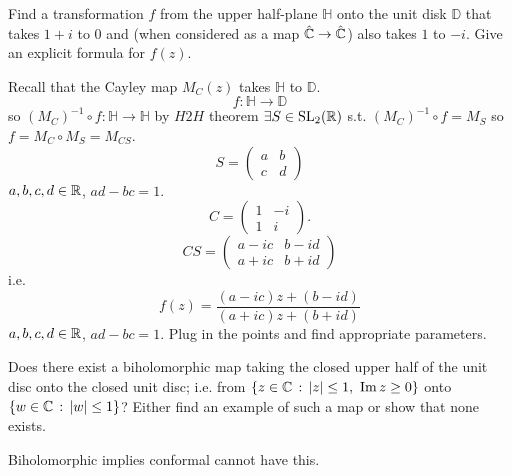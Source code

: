 \documentclass[10pt, a4paper]{article}
\begin{document}
\begin{problem}
    Find a \mobius transformation $f$ from the upper half-plane $\mathbb{H}$ onto the unit disk $\mathbb{D}$ that takes $1 + i$ to $0$ and
    (when considered as a map $\hat{\mathbb{C}} \to \hat{\mathbb{C}}$)
    also takes $1$ to $-i$.
    Give an explicit formula for $f(z)$.

    \begin{solution}
        Recall that the Cayley map $M_C(z)$ takes $\mathbb{H}$ to $\mathbb{D}$.
        \[
        f : \mathbb{H} \to \mathbb{D}
        \]
        so $(M_C) ^ {-1} \circ f : \mathbb{H} \to \mathbb{H}$ by $H2H$ theorem $\exists S \in \mathrm{SL}_2(\mathbb{R})$ s.t. $(M_C) ^ {-1} \circ f = M_S$ so $f = M_C \circ M_S = M_{CS}$.
        \[
        S = \begin{pmatrix}
            a & b \\ c & d
        \end{pmatrix}
        \]
        $a, b, c, d \in \mathbb{R}$,
        $ad - bc = 1$.
        \[
        C = \begin{pmatrix}
            1 & -i \\ 1 & i
        \end{pmatrix}.
        \]
        \[
        CS = \begin{pmatrix}
            a - ic & b - id \\
            a + ic & b + id
        \end{pmatrix}
        \]
        i.e.
        \[
        f(z) = \frac{(a - ic)z + (b - id)}{(a + ic)z + (b + id)}
        \]
        $a, b, c, d \in \mathbb{R}$,
        $ad - bc = 1$.
        Plug in the points and find appropriate parameters.
    \end{solution}
\end{problem}

\begin{problem}
    Does there exist a biholomorphic map taking the closed upper half of the unit disc onto the closed unit disc;
    i.e. from $\{z \in \mathbb{C}\,:\,|z| \leq 1,\ \mathrm{Im}\,{z} \geq 0\}$ onto $\{w \in \mathbb{C}\,:\,|w| \leq 1\}$?
    Either find an example of such a map or show that none exists.

    \begin{solution}
        Biholomorphic implies conformal cannot have this.
    \end{solution}
\end{problem}
\end{document}
